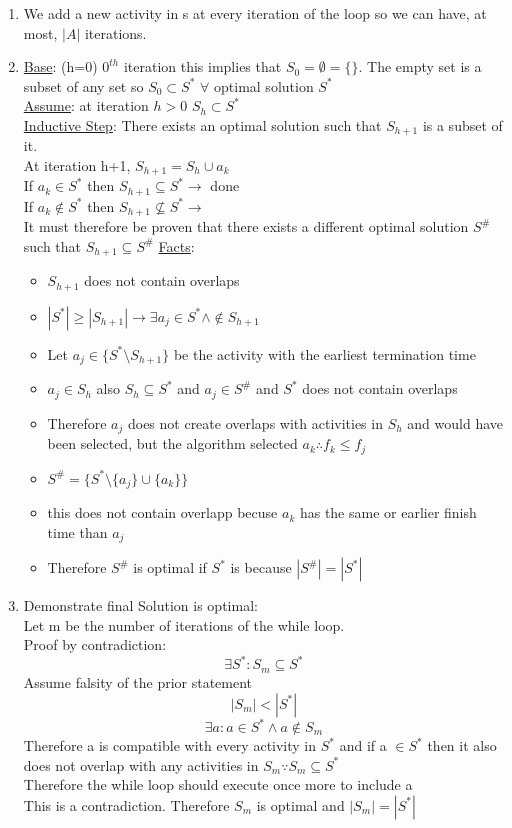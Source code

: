 \documentclass[12pt,letterpaper]{article}
\begin{document}
\begin{enumerate}
\item We add a new activity in s at every iteration of the loop so we can have, at most, $|A|$ iterations.
\item \underline{Base}: (h=0) $0^{th}$ iteration this implies that $S_0= \emptyset = \{\}$. The empty set is a subset of any set so $S_0 \subset S^*$ $\forall$ optimal solution $S^*$\\ 
\underline{Assume}: at iteration $h>0$ $S_h \subset S^*$ \\
\underline{Inductive Step}: There exists an optimal solution such that $S_{h+1}$ is a subset of it. \\
At iteration h+1, $S_{h+1}=S_h\cup{a_k}$\\
If $a_k\in S^*$ then $S_{h+1}\subseteq S^* \to$ done\\
If $a_k\notin S^*$ then $S_{h+1}\nsubseteq S^* \to$ \\ 
It must therefore be proven that there exists a different optimal solution $S^\#$ such that $S_{h+1} \subseteq S^\#$
\underline{Facts}:
\begin{itemize}
\item $S_{h+1}$ does not contain overlaps 
\item $|S^*|\geq |S_{h+1}|\to \exists a_j \in S^* \wedge \notin S_{h+1}$
\item Let $a_j \in \{ S^* \setminus S_{h+1}\}$ be the activity with the earliest termination time
\item $a_j \in S_h $ also $S_h \subseteq S^*$ and $a_j \in S^\#$ and $S^*$ does not contain overlaps
\item Therefore $a_j$ does not create overlaps with activities in $S_h$ and would have been selected, but the algorithm selected $a_k \therefore f_k\leq f_j$
\item $S^\#=\{S^* \setminus \{a_j\} \cup \{ a_k \} \} $
\item this does not contain overlapp becuse $a_k$ has the same or earlier finish time than $a_j$
\item Therefore $S^\#$ is optimal if $S^*$ is because $|S^\#|=|S^*|$
\end{itemize}
\item Demonstrate final Solution is optimal:\\
Let m be the number of iterations of the while loop.\\
Proof by contradiction:\\
\[\exists S^* : S_m \subseteq S^* \]
Assume falsity of the prior statement 
\[|S_m|<|S^*|\]
\[\exists a: a \in S^* \wedge a \notin S_m\]
Therefore a is compatible with every activity in $S^*$ and if a $\in S^*$ then it also does not overlap with any activities in $S_m\because S_m\subseteq S^*$\\
Therefore the while loop should execute once more to include a\\
This is a contradiction. Therefore $S_m$ is optimal and $|S_m|=|S^*|$
\end{enumerate}
\end{document}
